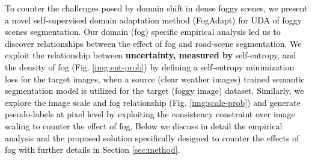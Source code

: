 \documentclass[final,5p,times,twocolumn]{elsarticle}
\begin{document}
\textcolor{black}{ To counter the challenges posed by domain shift in dense foggy scenes, we present a novel self-supervised domain adaptation method (FogAdapt) for UDA of foggy scenes segmentation. 
Our domain (fog) specific empirical analysis led us to discover relationships between the effect of fog and road-scene segmentation. 
\textcolor{black}{
We exploit the relationship between \textbf{uncertainty, measured by}  self-entropy, and the density of fog (Fig. \ref{img:ent-prob}) by deﬁning a self-entropy minimization loss for the target images,
when a source (clear weather images) trained semantic segmentation model is utilized for the target (foggy image) dataset.} 
Similarly, we explore the image scale and fog relationship (Fig. \ref{img:scale-prob}) and generate pseudo-labels at pixel level by exploiting the consistency constraint over image scaling to counter the effect of fog. Below we discuss in detail the empirical analysis and the proposed solution specifically designed to counter the effects of fog with further details in Section \ref{sec:method}. }
 
\end{document}
